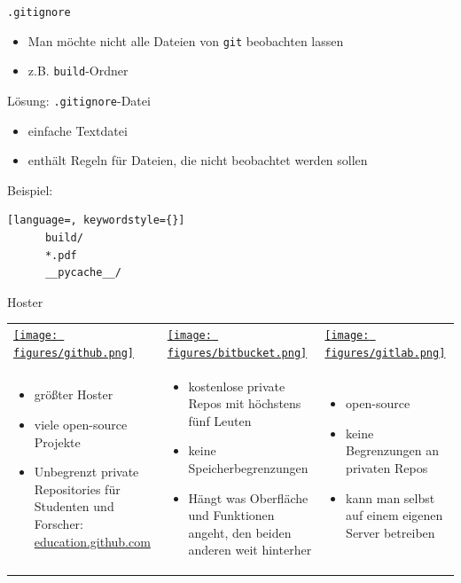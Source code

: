 \begin{frame}[fragile]{\texttt{.gitignore}}
    \begin{itemize}
    \item Man möchte nicht alle Dateien von \texttt{git} beobachten lassen
    \item z.B. \texttt{build}-Ordner
    \end{itemize}
    \begin{center}
        \Large Lösung: \texttt{.gitignore}-Datei
    \end{center}

    \begin{itemize}
    \item einfache Textdatei
    \item enthält Regeln für Dateien, die nicht beobachtet werden sollen
    \end{itemize}
    Beispiel:
    \vspace{1em}
    \begin{lstlisting}[language=, keywordstyle={}]
      build/
      *.pdf
      __pycache__/
    \end{lstlisting}
\end{frame}


\begin{frame}{Hoster}
  \begin{tabu}{@{} X[,C] @{} X[,C] @{} X[,C] @{}}
    \href{https://github.com}{\texttt{[image: figures/github.png]}} &
    \href{https://bitbucket.org}{\texttt{[image: figures/bitbucket.png]}} &
    \href{https://gitlab.com}{\texttt{[image: figures/gitlab.png]}} \\
    \begin{itemize}
      \item größter Hoster
      \item viele open-source Projekte
      \item Unbegrenzt private Repositories für Studenten und Forscher:  \newline
        \href{http://education.github.com}{education.github.com}
    \end{itemize}
    &
    \begin{itemize}
      \item kostenlose private Repos mit höchstens fünf Leuten
      \item keine Speicherbegrenzungen
      \item Hängt was Oberfläche und Funktionen angeht, den beiden anderen weit hinterher
    \end{itemize}
    &
    \begin{itemize}
      \item open-source
      \item keine Begrenzungen an privaten Repos
      \item kann man selbst auf einem eigenen Server betreiben
    \end{itemize}
  \end{tabu}
  \begin{center}
  \end{center}
\end{frame}

